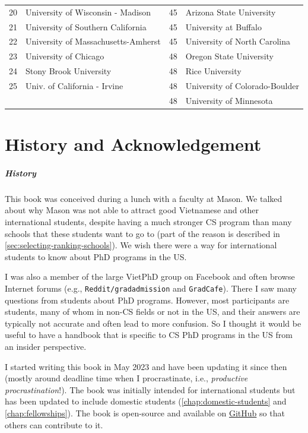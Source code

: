 \documentclass[oneside,11pt,dvipsnames]{book}
\newcommand{\red}[1]{{\color{red}{#1}}}
\begin{document}
\begin{table}
\begin{tabular}{rl|rl}
    20 &  University of Wisconsin - Madison\red{$^*$}  &45& Arizona State University\red{$^*$} \\
    21 &  University of Southern California &45& University at Buffalo\red{$^*$} \\
    22 & University of Massachusetts-Amherst\red{$^*$} &45& University of North Carolina\red{$^*$} \\
    23 & University of Chicago &48& Oregon State University\red{$^*$}\\
    24 & Stony Brook University\red{$^*$} &48& Rice University\\
    25 &  Univ. of California - Irvine&48& University of Colorado-Boulder \\
    & &48& University of Minnesota\\ 
    \bottomrule
  \end{tabular}
\end{table}

\chapter{History and Acknowledgement}\label{chap:ack}
\paragraph{History} This book was conceived during a lunch with a faculty at Mason.  We talked about why Mason was not able to attract good Vietnamese and other international students, despite having a much stronger CS program than many schools that these students want to go to (part of the reason is described in \autoref{sec:selecting-ranking-schools}). We wish there were a way for international students to know about PhD programs in the US.

I was also a member of the large VietPhD group on Facebook and often browse Internet forums (e.g., \texttt{Reddit/gradadmission} and \texttt{GradCafe}). There I saw many questions from students about PhD programs.  However, most participants are students, many of whom in non-CS fields or not in the US, and their answers are typically not accurate and often lead to more confusion. So I thought it would be useful to have a handbook that is specific to CS PhD programs in the US from an insider perspective.

I started writing this book in May 2023 and have been updating it since then (mostly around deadline time when I procrastinate, i.e., \emph{productive procrastination}!). The book was initially intended for international students but has been updated to include domestic students (\autoref{chap:domestic-students} and \autoref{chap:fellowships}).
The book is open-source and available on \href{https://github.com/dynaroars/phd-cs-us}{GitHub} so that others can contribute to it.
\end{document}
